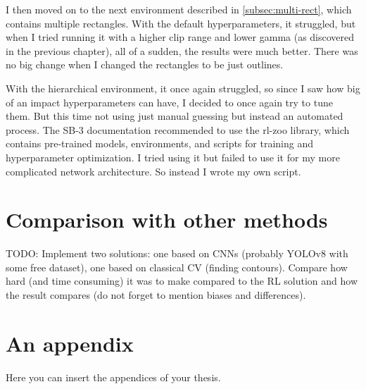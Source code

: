 \documentclass[
  digital,     %
  oneside,     %
  nosansbold,  %
  nocolorbold, %
  lof,         %
  lot,         %
]{fithesis4}
\begin{document}
I then moved on to the next environment described in \ref{subsec:multi-rect}, which contains multiple rectangles. With the default hyperparameters, it struggled, but when I tried running it with a higher clip range and lower gamma (as discovered in the previous chapter), all of a sudden, the results were much better. There was no big change when I changed the rectangles to be just outlines.

With the hierarchical environment, it once again struggled, so since I saw how big of an impact hyperparameters can have, I decided to once again try to tune them. But this time not using just manual guessing but instead an automated process. The SB-3 documentation recommended to use the rl-zoo library, which contains pre-trained models, environments, and scripts for training and hyperparameter optimization. I tried using it but failed to use it for my more complicated network architecture. So instead I wrote my own script.

\chapter{Comparison with other methods}
TODO: Implement two solutions: one based on CNNs (probably YOLOv8 with some free dataset), one based on classical CV (finding contours).
%
Compare how hard (and time consuming) it was to make compared to the RL solution and how the result compares (do not forget to mention biases and differences).


\printbibliography[heading=bibintoc] %


\appendix %
\chapter{An appendix}
Here you can insert the appendices of your thesis.
\end{document}
